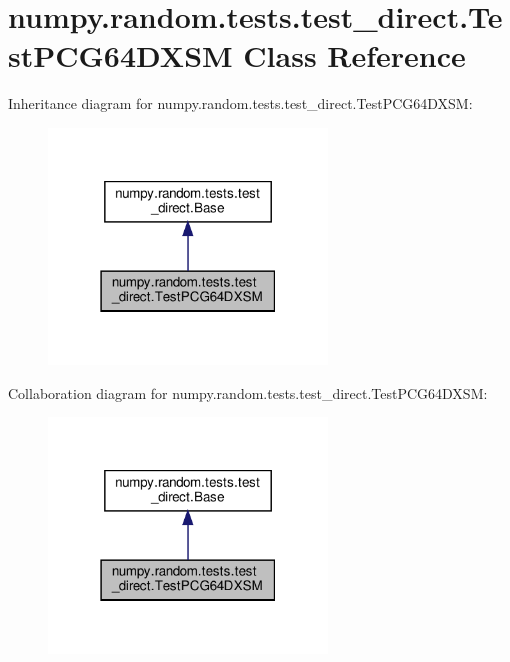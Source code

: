 \hypertarget{classnumpy_1_1random_1_1tests_1_1test__direct_1_1TestPCG64DXSM}{}\section{numpy.\+random.\+tests.\+test\+\_\+direct.\+Test\+P\+C\+G64\+D\+X\+SM Class Reference}
\label{classnumpy_1_1random_1_1tests_1_1test__direct_1_1TestPCG64DXSM}


Inheritance diagram for numpy.\+random.\+tests.\+test\+\_\+direct.\+Test\+P\+C\+G64\+D\+X\+SM\+:
\nopagebreak
\begin{figure}[H]
\begin{center}
\leavevmode
\includegraphics[width=210pt]{classnumpy_1_1random_1_1tests_1_1test__direct_1_1TestPCG64DXSM__inherit__graph}
\end{center}
\end{figure}


Collaboration diagram for numpy.\+random.\+tests.\+test\+\_\+direct.\+Test\+P\+C\+G64\+D\+X\+SM\+:
\nopagebreak
\begin{figure}[H]
\begin{center}
\leavevmode
\includegraphics[width=210pt]{classnumpy_1_1random_1_1tests_1_1test__direct_1_1TestPCG64DXSM__coll__graph}
\end{center}
\end{figure}
